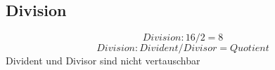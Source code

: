 \subsection{Division}

$$Division: 16/2=8$$
$$Division: Divident/Divisor=Quotient$$
Divident und Divisor sind nicht vertauschbar